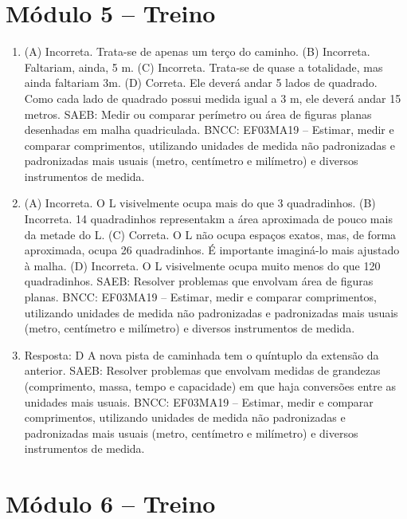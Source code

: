 \section*{Módulo 5 -- Treino}

\begin{enumerate}
\item
(A) Incorreta. Trata-se de apenas um terço do caminho.
(B) Incorreta. Faltariam, ainda, 5 m.
(C) Incorreta. Trata-se de quase a totalidade, mas ainda faltariam 3m.
(D) Correta. Ele deverá andar 5 lados de quadrado. Como cada lado de quadrado possui
medida igual a 3 m, ele deverá andar 15 metros.
SAEB: Medir ou comparar perímetro ou área de figuras planas desenhadas em malha quadriculada. 
BNCC: EF03MA19 -- Estimar, medir e comparar comprimentos, utilizando unidades de medida
não padronizadas e padronizadas mais usuais (metro, centímetro e milímetro) e diversos
instrumentos de medida.

\item
(A) Incorreta. O L visivelmente ocupa mais do que 3 quadradinhos.
(B) Incorreta. 14 quadradinhos representakm a área aproximada de pouco mais da metade do L.
(C) Correta. O L não ocupa espaços exatos, mas, de forma aproximada, ocupa 26 quadradinhos. É importante imaginá-lo mais ajustado à malha.
(D) Incorreta. O L visivelmente ocupa muito menos do que 120 quadradinhos.
SAEB: Resolver problemas que envolvam área de figuras planas. 
BNCC: EF03MA19 -- Estimar, medir e comparar comprimentos, utilizando unidades de medida
não padronizadas e padronizadas mais usuais (metro, centímetro e milímetro) e diversos
instrumentos de medida.

\item
Resposta: D
A nova pista de caminhada tem o quíntuplo da extensão da anterior.
SAEB: Resolver problemas que envolvam medidas de grandezas (comprimento, massa, tempo e capacidade) em que haja conversões entre as unidades mais usuais. 
BNCC: EF03MA19 -- Estimar, medir e comparar comprimentos, utilizando unidades de medida
não padronizadas e padronizadas mais usuais (metro, centímetro e milímetro) e diversos
instrumentos de medida.
\end{enumerate}

\section*{Módulo 6 -- Treino}

